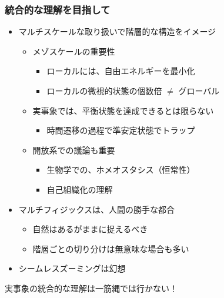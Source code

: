\documentclass[12pt, dvipdfmx]{beamer}
\begin{document}
\begin{frame}
    \frametitle{統合的な理解を目指して}
    \begin{itemize}
        \item マルチスケールな取り扱いで階層的な構造をイメージ
        \begin{itemize}
            \item メゾスケールの重要性
            \begin{itemize}
                \item ローカルには、自由エネルギーを最小化
                \item ローカルの微視的状態の個数倍 $\neq$ グローバル
            \end{itemize}
            \item 実事象では、平衡状態を達成できるとは限らない
            \begin{itemize}
                \item 時間遷移の過程で準安定状態でトラップ
            \end{itemize}
            \item 開放系での議論も重要
            \begin{itemize}
                \item 生物学での、ホメオスタシス（恒常性）
                \item 自己組織化の理解
            \end{itemize}
        \end{itemize}
        \item マルチフィジックスは、人間の勝手な都合
        \begin{itemize}
            \item 自然はあるがままに捉えるべき
            \item 階層ごとの切り分けは無意味な場合も多い
        \end{itemize}
        \item シームレスズーミングは幻想
    \end{itemize}
    \large{\alert{実事象の統合的な理解は一筋縄では行かない！}}
\end{frame}
\end{document}
